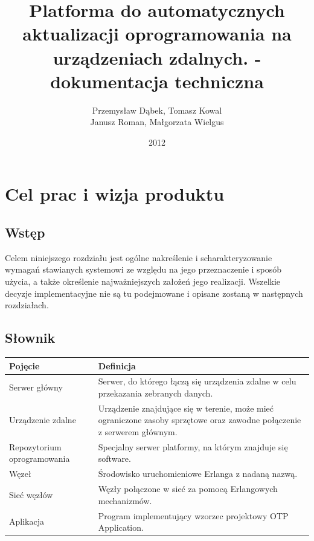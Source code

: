 \documentclass[polish,12pt]{aghthesis}
\author{Przemysław Dąbek, Tomasz Kowal\\ Janusz Roman, Małgorzata Wielgus}
\title{Platforma do automatycznych aktualizacji oprogramowania na urządzeniach zdalnych. - dokumentacja techniczna}
\date{2012}
\begin{document}
\maketitle





\section{Cel prac i wizja produktu}
\label{sec:cel-wizja}
\subsection{Wstęp}
Celem niniejszego rozdziału jest ogólne nakreślenie i scharakteryzowanie wymagań stawianych systemowi ze względu na jego przeznaczenie i sposób użycia, a także określenie najważniejszych założeń jego realizacji.
Wszelkie decyzje implementacyjne nie są tu podejmowane i opisane zostaną w następnych rozdziałach.
\subsection{Słownik}
\begin{tabular}{| l | p{9cm} |}
  \hline
  Pojęcie & Definicja \\ \hline
  Serwer główny & Serwer, do którego łączą się urządzenia zdalne w celu przekazania zebranych danych.\\ \hline
  Urządzenie zdalne & Urządzenie znajdujące się w terenie, może mieć ograniczone zasoby sprzętowe oraz zawodne połączenie z serwerem głównym.\\ \hline
  Repozytorium oprogramowania & Specjalny serwer platformy, na którym znajduje się software.\\ \hline
  Węzeł & Środowisko uruchomieniowe Erlanga z nadaną nazwą.\\ \hline
  Sieć węzłów & Węzły połączone w sieć za pomocą Erlangowych mechanizmów.\\ \hline
  Aplikacja & Program implementujący wzorzec projektowy OTP Application. \\ \hline
\end{tabular}
\end{document}
